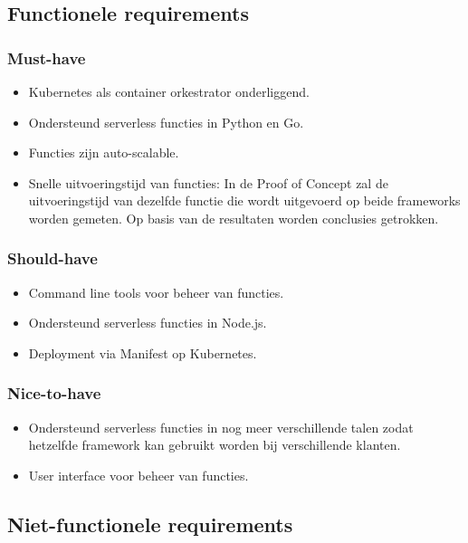 \subsection{Functionele requirements}
\subsubsection{Must-have}
\begin{itemize}
    \item Kubernetes als container orkestrator onderliggend.
    \item Ondersteund serverless functies in Python en Go.
    \item Functies zijn auto-scalable.
    \item Snelle uitvoeringstijd van functies: In de Proof of Concept zal de uitvoeringstijd van dezelfde functie die wordt uitgevoerd op beide frameworks worden gemeten. Op basis van de resultaten worden conclusies getrokken.
\end{itemize}
\subsubsection{Should-have}
\begin{itemize}
    \item Command line tools voor beheer van functies.
    \item Ondersteund serverless functies in Node.js.
    \item Deployment via Manifest op Kubernetes.
\end{itemize}
\subsubsection{Nice-to-have}
\begin{itemize}
    \item Ondersteund serverless functies in nog meer verschillende talen zodat hetzelfde framework kan gebruikt worden bij verschillende klanten.
    \item User interface voor beheer van functies.
\end{itemize}
\subsection{Niet-functionele requirements}
